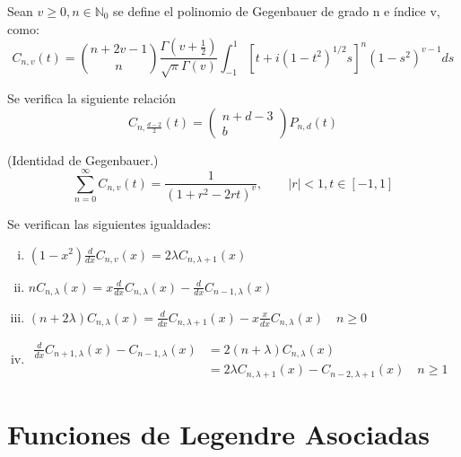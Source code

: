 \begin{defn}Sean $v\ge 0,n\in\mathds{N}_0$ se define el polinomio de Gegenbauer de grado n e índice v, como:
	$$C_{n,v}(t) = \binom{n+2v-1}{n}\frac{\Gamma(v+\frac{1}{2})}{\sqrt{\pi}\Gamma(v)}\int_{-1}^{1}\left[t+i(1-t^2)^{1/2}s\right]^n (1-s^2)^{v-1} ds$$ 
\end{defn}

\begin{prop}\label{geb_rel}Se verifica la siguiente relación
	$$C_{n,\frac{d-2}{2}}(t) = \begin{pmatrix}
	n+d-3 \\
	b
	\end{pmatrix} P_{n,d}(t)
	$$
\end{prop}
\begin{prop}(Identidad de Gegenbauer.)$$
	\sum_{n=0}^{\infty} C_{n,v}(t) = \frac{1}{(1+r^2-2rt)^v}, \qquad |r|<1, t\in[-1,1]$$
\end{prop}
\begin{prop}\label{propGg} Se verifican las siguientes igualdades:
	\begin{enumerate}[(i)]
	\item $(1-x^2) \frac{d}{dx} C_{n,v}(x) = 2\lambda C_{n,\lambda+1}(x)$
	\item $nC_{n,\lambda}(x) = x\frac{d}{dx} C_{n,\lambda}(x) - \frac{d}{dx} C_{n-1,\lambda}(x)$
	\item $(n+2\lambda) C_{n,\lambda}(x)  = \frac{d}{dx}C_{n,\lambda+1}(x)-x \frac{x}{dx}C_{n,\lambda}(x) \quad n\ge 0$
	\item $\begin{aligned}
		\frac{d}{dx} C_{n+1,\lambda}(x) - C_{n-1,\lambda}(x)  &= 2(n+\lambda)C_{n,\lambda}(x)\\ &= 2\lambda C_{n,\lambda+1}(x) - C_{n-2,\lambda+1}(x) \quad n\ge 1
	\end{aligned}$        	
\end{enumerate}
\end{prop}
\chapter{Funciones de Legendre Asociadas}\label{aped.E}

